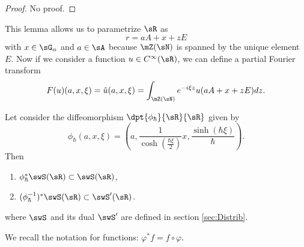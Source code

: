 \begin{proof}
No proof.
\end{proof}

This lemma allows us to parametrize $\sR$ as
\[ 
  r=aA+x+zE
\]
with $x\in\sG_{\alpha}$ and $a\in \sA$ because $\mZ(\sN)$ is spanned by the unique element $E$. Now if we consider a function $u\in C^{\infty}(\sR)$, we can define a partial Fourier transform
\[ 
  F(u)(a,x,\xi)=\hat u(a,x,\xi)=\int_{\mZ(\sN)}e^{-i\xi z}u(aA+x+zE)dz.
\]

\begin{theorem}
Let consider the diffeomorphism $\dpt{\phi_{\hbar}}{\sR}{\sR}$ given by
\[ 
   \phi_{\hbar}(a,x,\xi)=\left( a,\frac{1}{\cosh(\frac{\hbar\xi}{2})}x,\frac{\sinh(\hbar\xi)}{\hbar} \right).
\] 
Then 

\begin{enumerate}
\item $\phi_{\hbar}^*\swS(\sR)\subset\swS(\sR)$,
\item $(\phi^{-1}_{\hbar})^*\swS(\sR)\subset\swS'(\sR)$.
\end{enumerate}
where $\swS$ and its dual $\swS'$ are defined in section \ref{sec:Distrib}.

\end{theorem}

We recall the notation for functions: $\varphi^*f=f\circ\varphi$.

